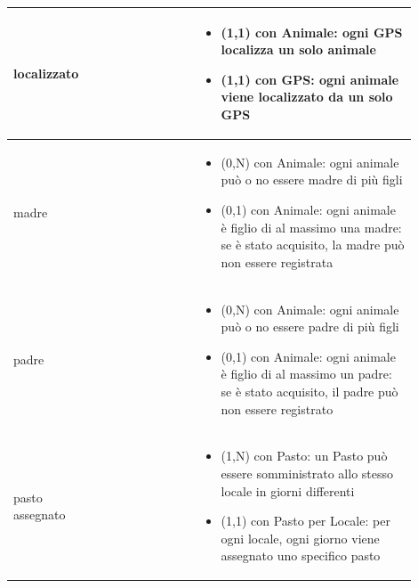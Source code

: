 \documentclass[12pt,a4paper]{article}
\begin{document}
\begin{center}
\begin{longtable}{|p{0.16\linewidth}|p{0.24\linewidth}|p{0.50\linewidth}|}
\hline
localizzato				& \begin{flushleft}\vspace{-15pt}  \end{flushleft}
					& \begin{itemize}
						\setlength{\itemindent}{-1em}
						\vspace{-25pt}
						\setlength\itemsep{-0.25em}
						\item (1,1) con Animale: ogni GPS localizza un solo animale
						\item (1,1) con GPS: ogni animale viene localizzato da un solo GPS
					\end{itemize}\\ 

\hline
madre				&\begin{flushleft}\vspace{-15pt}  \end{flushleft}
					&\begin{itemize}
						\setlength{\itemindent}{-1em}
						\vspace{-25pt}
						\setlength\itemsep{-0.25em}
						\item (0,N) con Animale: ogni animale può o no essere madre di più figli
						\item (0,1) con Animale: ogni animale è figlio di al massimo una madre: se è stato acquisito, la madre può non essere registrata
					\end{itemize}\\ 

\hline
padre				&\begin{flushleft}\vspace{-15pt}  \end{flushleft}
					&\begin{itemize}
						\setlength{\itemindent}{-1em}
						\vspace{-25pt}
						\setlength\itemsep{-0.25em}
						\item (0,N) con Animale: ogni animale può o no essere padre di più figli
						\item (0,1) con Animale: ogni animale è figlio di al massimo un padre: se è stato acquisito, il padre può non essere registrato
					\end{itemize}\\ 

\hline
pasto assegnato 				& \begin{flushleft}\vspace{-25pt} \end{flushleft}
					& \begin{itemize}
						\setlength{\itemindent}{-1em}
						\vspace{-25pt}
						\setlength\itemsep{-0.25em}
						\item (1,N) con Pasto: un Pasto può essere somministrato allo stesso locale in giorni differenti
						\item (1,1) con Pasto per Locale: per ogni locale, ogni giorno viene assegnato uno specifico pasto
					\end{itemize}\\ 


\end{longtable}
\end{center}
\end{document}

